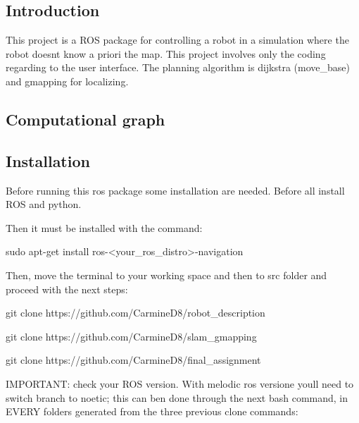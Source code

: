 \subsection*{Introduction}

This project is a R\+OS package for controlling a robot in a simulation where the robot doesn\textquotesingle{}t know a priori the map. This project involves only the coding regarding to the user interface. The planning algorithm is dijkstra (move\+\_\+base) and gmapping for localizing.

\subsection*{Computational graph}



\subsection*{Installation}

Before running this ros package some installation are needed. Before all install R\+OS and python.

Then it must be installed with the command\+:


\begin{DoxyCode}
sudo apt-get install ros-<your\_ros\_distro>-navigation
\end{DoxyCode}


Then, move the terminal to your working space and then to src folder and proceed with the next steps\+:


\begin{DoxyCode}
git clone https://github.com/CarmineD8/robot\_description
\end{DoxyCode}



\begin{DoxyCode}
git clone https://github.com/CarmineD8/slam\_gmapping
\end{DoxyCode}



\begin{DoxyCode}
git clone https://github.com/CarmineD8/final\_assignment
\end{DoxyCode}


I\+M\+P\+O\+R\+T\+A\+NT\+: check your R\+OS version. With melodic ros versione you\textquotesingle{}ll need to switch branch to \textquotesingle{}noetic\textquotesingle{}; this can ben done through the next bash command, in E\+V\+E\+RY folders generated from the three previous clone commands\+:



